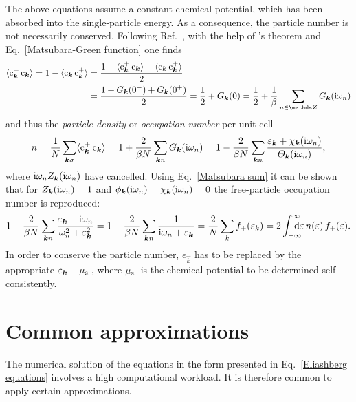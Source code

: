 The above equations assume a constant chemical potential, which has been
absorbed into the single-particle energy. As a consequence, the particle number
is not necessarily conserved. Following
Ref.~, with the help of
's theorem and Eq.~\ref{Matsubara-Green function} one finds
%
\begin{align*}
   \av{\op c_{\vec k}^+ \, \op c_{\vec k}}
   = 1 - \av{\op c_{\vec k} \, \op c_{\vec k}^+}
   &= \frac { 1
      + \av{\op c_{\vec k}^+ \, \op c_{\vec k}}
      - \av{\op c_{\vec k} \, \op c_{\vec k}^+}
      } 2
   \\
   &= \frac {1 + G_{\vec k}(0^-) + G_{\vec k}(0^+)} 2
   = \frac 1 2 + G_{\vec k}(0)
   = \frac 1 2 + \frac 1 \beta \sum_{n \in \mathds Z} G_{\vec k}(\I \omega_n)
\end{align*}
%
and thus the \emph{particle density} or \emph{occupation number} per unit cell
%
\begin{equation*}
   n = \frac 1 N \sum_{\boldsymbol k \sigma} \langle\mathrm c_{\boldsymbol k}^+ \, \mathrm c_{\boldsymbol k}\rangle
   = 1 + \frac 2 {\beta N} \sum_{\boldsymbol k n} G_{\boldsymbol k}(\mathrm i \omega_n)
   = 1 - \frac 2 {\beta N} \sum_{\boldsymbol k n} \frac
      {\varepsilon_{\boldsymbol k} + \chi_{\boldsymbol k}(\mathrm i \omega_n)}
      {\varTheta_{\boldsymbol k}(\mathrm i \omega_n)},
\end{equation*}
%
where $\mathrm i \omega_n Z_{\boldsymbol k}(\mathrm i \omega_n)$ have cancelled. Using
Eq.~\ref{Matsubara sum} it can be shown that for $Z_{\boldsymbol k}(\mathrm i \omega_n) = 1$
and $\phi_{\boldsymbol k}(\mathrm i \omega_n) = \chi_{\boldsymbol k}(\mathrm i \omega_n) = 0$ the
free-particle occupation number is reproduced:
%
\begin{equation*}
   1 - \frac 2 {\beta N} \sum_{\vec k n}
   \frac
      {\epsilon_{\vec k} \textcolor{gray}{{} - \I \omega_n}}
      {\omega_n^2 + \epsilon_{\vec k}^2}
   = 1 - \frac 2 {\beta N} \sum_{\vec k n}
   \frac 1 {\I \omega_n + \epsilon_{\vec k}}
   = \frac 2 N \sum_k f_+(\epsilon_k)
   = 2 \int \from{-\infty} \till \infty \D \epsilon \,
   n(\epsilon) \, f_+(\epsilon).
\end{equation*}
%
In order to conserve the particle number, $\epsilon_{\vec k}$ has to be replaced
by the appropriate $\varepsilon_{\boldsymbol k} - \mu \sb{\text{s.}}$, where $\mu \sb{\text{s.}}$ is
the chemical potential to be determined self-consistently.

\section{Common approximations}

The numerical solution of the  equations in the form presented
in Eq.~\ref{Eliashberg equations} involves a high computational workload. It is
therefore common to apply certain approximations.

